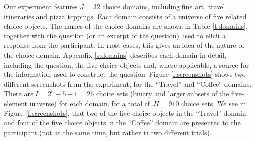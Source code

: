 \documentclass[11pt,letter]{article}
\begin{document}
Our experiment features $J=32$ choice domains, including fine art, travel itineraries and pizza toppings.
Each domain consists of a universe of five related choice objects.
The names of the choice domains are shown in Table \ref{t:domains}, together with the question (or an excerpt of the question) used to elicit a response from the participant.
In most cases, this gives an idea of the nature of the choice domain.
Appendix \ref{s:domains} describes each domain in detail, including the question, the five choice objects and, where applicable, a source for the information used to construct the question.
Figure \ref{f:screenshots} shows two different screenshots from the experiment, for the ``Travel'' and ``Coffee'' domains.
There are $I=2^{5}-5-1=26$ choice sets (binary and larger subsets of the five-element universe) for each domain, for a total of $JI=910$ choice sets.
We see in Figure \ref{f:screenshots}, that two of the five choice objects in the ``Travel'' domain and four of the five choice objects in the ``Coffee'' domain are presented to the participant (not at the same time, but rather in two different trials).
\end{document}
